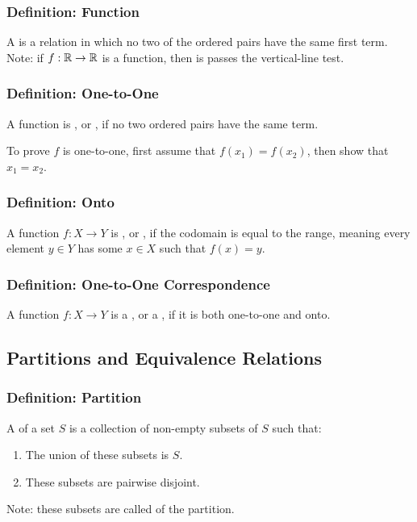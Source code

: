 \subsubsection*{Definition: Function}
A  is a relation in which no two of the ordered pairs have the same first term. Note: if $f:\mathbb{R} \rightarrow \mathbb{R}$ is a function, then is passes the vertical-line test.

\subsubsection*{Definition: One-to-One}
A function is , or , if no two ordered pairs have the same  term.

To prove $f$ is one-to-one, first assume that $f(x_1) = f(x_2)$, then show that $x_1 = x_2$.

\subsubsection*{Definition: Onto}
A function $f: X \rightarrow Y$ is , or , if the codomain is equal to the range, meaning every element $y \in Y$ has some $x \in X$ such that $f(x) = y$.

\subsubsection*{Definition: One-to-One Correspondence}
A function $f: X \rightarrow Y$ is a , or a , if it is both one-to-one and onto.

\subsection{Partitions and Equivalence Relations}

\subsubsection*{Definition: Partition}
A  of a set $S$ is a collection of non-empty subsets of $S$ such that:
\begin{enumerate}
    \item The union of these subsets is $S$.
    \item These subsets are pairwise disjoint.
\end{enumerate}
Note: these subsets are called  of the partition.

